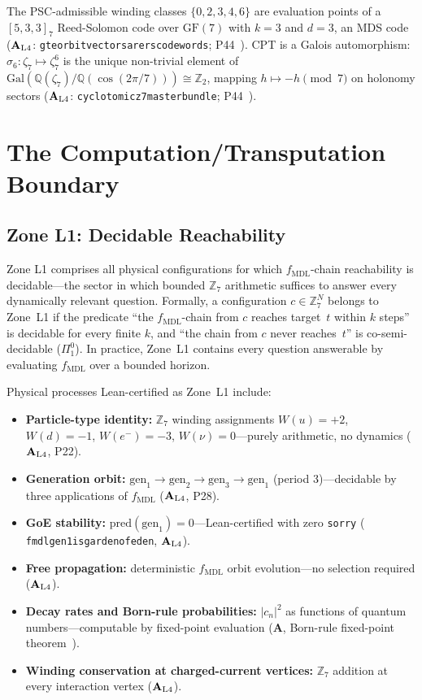 \documentclass[12pt,letterpaper]{article}
\newcommand{\fmdl}{f_{\mathrm{MDL}}}
\newcommand{\Zseven}{\mathbb{Z}_7}
\newcommand{\catAL}{\ensuremath{\textbf{A}_{\rm L4}}}
\newcommand{\catA}{\textbf{A}}
\newcommand{\lean}[1]{%
  \penalty-100
  \begingroup\def\_{\textunderscore\allowbreak}\texttt{#1}\endgroup}
\begin{document}
The PSC-admissible winding classes $\{0,2,3,4,6\}$ are evaluation points of a
$[5,3,3]_7$ Reed-Solomon code over $\mathrm{GF}(7)$ with $k=3$ and $d=3$, an MDS code
(\catAL: \lean{gte\_orbit\_vectors\_are\_rs\_codewords}; P44~\cite{SpivackQGR}).
CPT is a Galois automorphism: $\sigma_6: \zeta_7 \mapsto \zeta_7^6$ is the unique
non-trivial element of $\mathrm{Gal}(\mathbb{Q}(\zeta_7)/\mathbb{Q}(\cos(2\pi/7)))
\cong \mathbb{Z}_2$, mapping $h \mapsto -h \pmod{7}$ on holonomy sectors
(\catAL: \lean{cyclotomic\_z7\_master\_bundle}; P44~\cite{SpivackQGR}).

\section{The Computation/Transputation Boundary}
\label{sec:boundary}

\subsection{Zone L1: Decidable Reachability}
\label{sec:zone1}

Zone L1 comprises all physical configurations for which $\fmdl$-chain
reachability is decidable---the sector in which bounded $\Zseven$ arithmetic
suffices to answer every dynamically relevant question.  Formally, a
configuration $c \in \Zseven^N$ belongs to Zone~L1 if the predicate ``the
$\fmdl$-chain from $c$ reaches target~$t$ within $k$ steps'' is decidable for
every finite $k$, and ``the chain from $c$ never reaches~$t$'' is
co-semi-decidable ($\Pi^0_1$).  In practice, Zone~L1 contains every question
answerable by evaluating $\fmdl$ over a bounded horizon.

Physical processes Lean-certified as Zone~L1 include:
\begin{itemize}[nosep]
  \item \textbf{Particle-type identity:} $\Zseven$ winding assignments
        $W(u) = +2$, $W(d) = -1$, $W(e^-) = -3$, $W(\nu) = 0$---purely
        arithmetic, no dynamics (\catAL, P22).
  \item \textbf{Generation orbit:} $\mathrm{gen}_1 \to \mathrm{gen}_2 \to
        \mathrm{gen}_3 \to \mathrm{gen}_1$ (period 3)---decidable by three
        applications of $\fmdl$ (\catAL, P28).
  \item \textbf{GoE stability:} $\mathrm{pred}(\mathrm{gen}_1) = 0$---Lean-certified
        with zero \texttt{sorry} (\lean{fmdl\_gen1\_is\allowbreak\_garden\_of\_eden}, \catAL).
  \item \textbf{Free propagation:} deterministic $\fmdl$ orbit evolution---no
        selection required (\catAL).
  \item \textbf{Decay rates and Born-rule probabilities:} $|c_n|^2$ as
        functions of quantum numbers---computable by fixed-point evaluation
        (\catA, Born-rule fixed-point theorem~\cite{SpivackBornRule}).
  \item \textbf{Winding conservation at charged-current vertices:}
        $\Zseven$ addition at every interaction vertex (\catAL).
\end{itemize}
\end{document}
